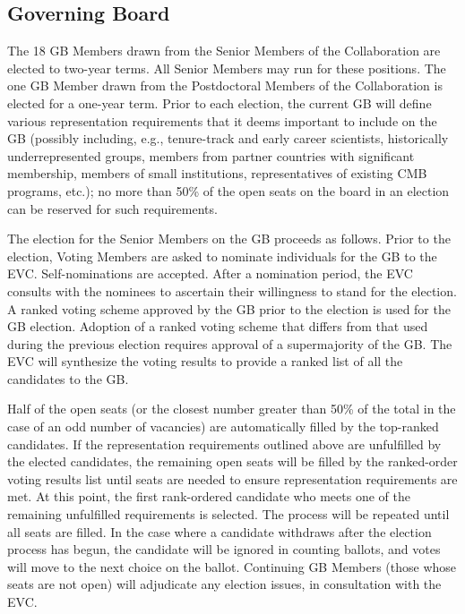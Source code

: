 \documentclass[12pt]{article}
\begin{document}

\bigskip
\subsection{Governing Board}
\label{sec:gb-elections}

The 18 GB Members drawn from the Senior Members of the Collaboration are elected to two-year terms.  All Senior Members may  run for these positions. The one GB Member drawn from the Postdoctoral Members of the Collaboration is elected for a one-year term. Prior to each election, the current GB will define various representation requirements that it deems important to include on the GB (possibly including, e.g., tenure-track and early career scientists,  historically underrepresented groups, members from partner countries with significant membership, members of small institutions, representatives of existing CMB programs, etc.); no more than 50\% of the open seats on the board in an election can be reserved for such requirements.

The election for the Senior Members on the GB proceeds as follows. 
Prior to the election, Voting Members are asked to nominate individuals for the GB to the EVC.   Self-nominations are accepted. After a nomination period, the EVC consults with the nominees to ascertain their willingness to stand for the election. A ranked voting scheme approved by the GB prior to the election is used for the GB election. Adoption of a ranked voting scheme that differs from that used during the previous election requires approval of a supermajority of the GB. The EVC will synthesize the voting results to provide a ranked list of all the candidates to the GB. 

Half of the open seats (or the closest number greater than 50\% of the total in the case of an odd number of vacancies) are automatically filled by the top-ranked candidates. If the representation requirements outlined above are unfulfilled by the elected candidates, the remaining open seats will be filled by the ranked-order voting results list until seats are needed to ensure representation requirements are met. At this point, the first rank-ordered candidate who meets one of the remaining unfulfilled requirements is selected. The process will be repeated until all seats are filled. In the case where a candidate withdraws after the election process has begun, the candidate will be ignored in counting ballots, and votes will move to the next choice on the ballot. Continuing GB Members (those whose seats are not open) will adjudicate any election issues, in consultation with the EVC.
\end{document}
